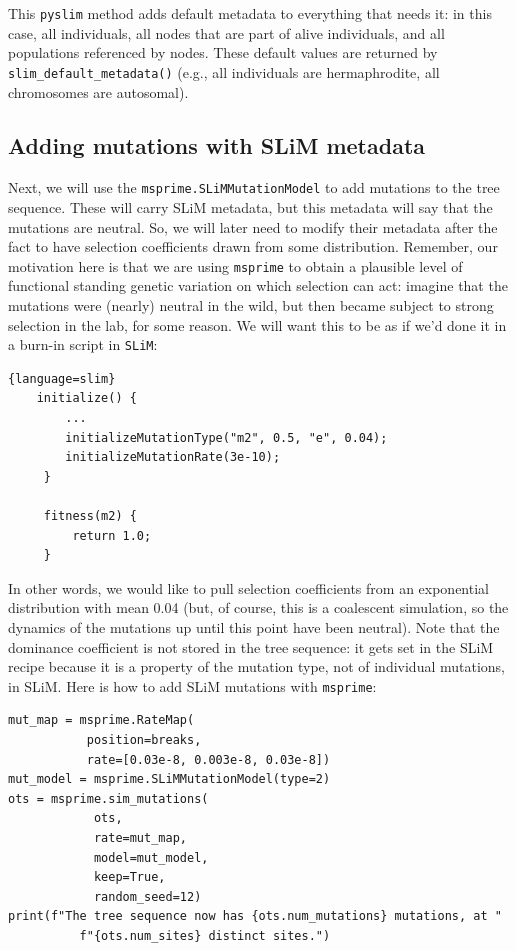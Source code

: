 \documentclass[12pt]{article}
\newcommand{\msprime}[0]{\texttt{msprime}\xspace}
\newcommand{\slim}[0]{\texttt{SLiM}\xspace}
\newcommand{\pyslim}[0]{\texttt{pyslim}\xspace}
\begin{document}
This \pyslim method adds default metadata to everything that needs it:
in this case, all individuals, all nodes that are part of alive individuals, and all populations referenced by nodes.
These default values are returned by \verb|slim_default_metadata()| (e.g., all individuals are hermaphrodite, all chromosomes are autosomal).

\subsection*{Adding mutations with SLiM metadata}

Next, we will use the \verb|msprime.SLiMMutationModel| to add mutations to the tree sequence.
These will carry SLiM metadata, but this metadata will say that the mutations are neutral.
So, we will later need to modify their metadata after the fact to have selection coefficients drawn from some distribution.
Remember, our motivation here is that we are using \msprime to obtain a plausible level of functional standing genetic variation on which selection can act:
imagine that the mutations were (nearly) neutral in the wild, but then became subject to strong selection in the lab, for some reason.
We will want this to be as if we'd done it in a burn-in script in \slim :

\begin{lstlisting}{language=slim}
    initialize() {
        ...
        initializeMutationType("m2", 0.5, "e", 0.04);
        initializeMutationRate(3e-10);
     }
  
     fitness(m2) {
         return 1.0;
     }
\end{lstlisting}

In other words, we would like to pull selection coefficients from an exponential distribution with mean 0.04
(but, of course, this is a coalescent simulation, so the dynamics of the mutations up until this point have been neutral).
Note that the dominance coefficient is not stored in the tree sequence:
it gets set in the SLiM recipe because it is a property of the mutation type, not of individual mutations, in SLiM.
Here is how to add SLiM mutations with \msprime :

\begin{listing}[H]
    \begin{verbatim}
mut_map = msprime.RateMap(
           position=breaks,
           rate=[0.03e-8, 0.003e-8, 0.03e-8])
mut_model = msprime.SLiMMutationModel(type=2)
ots = msprime.sim_mutations(
            ots,
            rate=mut_map,
            model=mut_model,
            keep=True, 
            random_seed=12)
print(f"The tree sequence now has {ots.num_mutations} mutations, at "
          f"{ots.num_sites} distinct sites.")
  \end{verbatim}
\end{listing}
\end{document}
